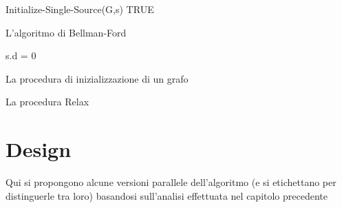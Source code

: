 \documentclass[a4paper]{article}
\begin{document}
	\begin{algorithm}[H]
		Initialize-Single-Source(G,s)\;
		\Return TRUE\;
		\caption{L'algoritmo di Bellman-Ford}
	\end{algorithm}

	\begin{algorithm}[H]
		s.d = 0\;
		\caption{La procedura di inizializzazione di un grafo}
	\end{algorithm}

	\begin{algorithm}[H]
		\caption{La procedura Relax}
	\end{algorithm}
	
	\section{Design}
	\label{section:design}
	Qui si propongono alcune versioni parallele dell'algoritmo (e si etichettano per distinguerle tra loro) basandosi sull'analisi effettuata nel capitolo precedente
	
\end{document}
